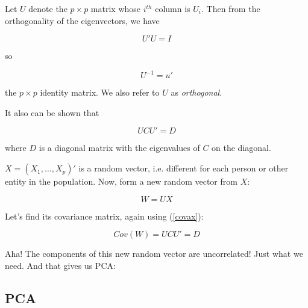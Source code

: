 Let $U$ denote the $p \times p$ matrix whose $i^{th}$ column is $U_i$.
Then from the orthogonality of the eigenvectors, we have

\begin{equation}
\label{uui}
U'U = I
\end{equation}

so

\begin{equation}
U^{-1} = u'
\end{equation}

the $p \times p$ identity matrix.  We also refer to $U$ as
\emph{orthogonal}.

It also can be shown that 

\begin{equation}
U C U' = D
\end{equation}

where $D$ is a diagonal matrix with the eigenvalues of $C$ on the
diagonal.

% 


$X = (X_1,...,X_p)'$ is a random vector, i.e. different for each person
or other entity in the population.  Now, form a new random vector from
$X$:

\begin{equation}
W = UX
\end{equation}

Let's find its covariance matrix, again using (\ref{covax}):

\begin{equation}
Cov(W) = U C U' = D
\end{equation}

Aha!  The components of this new random vector are uncorrelated!  Just
what we need.  And that gives us PCA:

\subsection{PCA}

